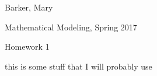 \documentclass{article}
\def \hwnum{1}
\def \hwdescription{this is some stuff that I will probably use}
\begin{document}
\begin{center}
{
	\fontsize{20pt}{20pt}\selectfont
	Barker, Mary
}

\vspace{1cm}

{
	\fontsize{20pt}{20pt}\selectfont
	Mathematical Modeling, Spring 2017
}


{
	\fontsize{20pt}{20pt}\selectfont
	Homework \hwnum
}


{
	\fontsize{20pt}{20pt}\selectfont
	\hwdescription
}

\end{center}
\pagebreak



\end{document}
